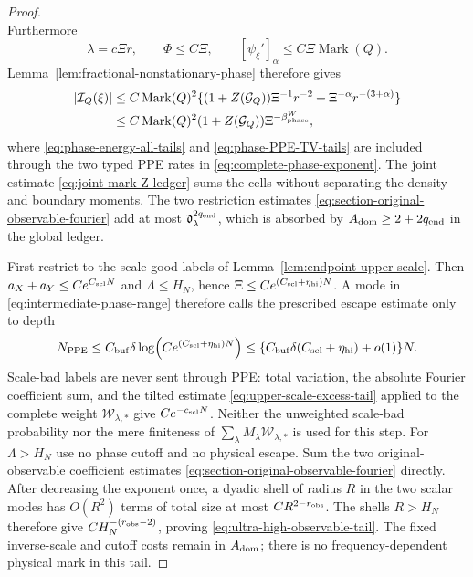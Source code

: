 \documentclass[11pt]{article}
\begin{document}
\begin{proof}
\[\]
Furthermore
\[
 \lambda=c\Xi r,\qquad
 \Phi\le C\Xi,\qquad
 [\psi_\xi']_\alpha\le C\Xi\operatorname{Mark}(Q).
\]
Lemma~\ref{lem:fractional-nonstationary-phase} therefore gives
\begin{align*}
 |\mathcal I_Q(\xi)|
 &\le C\operatorname{Mark}(Q)^2
 \{(1+Z(\mathcal G_Q))\Xi^{-1}r^{-2}
        +\Xi^{-\alpha}r^{-(3+\alpha)}\}\\
 &\le C\operatorname{Mark}(Q)^2(1+Z(\mathcal G_Q))
       \Xi^{-\beta_{\rm phase}^{W}},
\end{align*}
where \eqref{eq:phase-energy-all-tails} and
\eqref{eq:phase-PPE-TV-tails} are included through the two typed PPE rates
in \eqref{eq:complete-phase-exponent}.
The joint estimate \eqref{eq:joint-mark-Z-ledger} sums the cells without
separating the density and boundary moments.  The two restriction estimates
\eqref{eq:section-original-observable-fourier} add at most
$\mathfrak d_\lambda^{2q_{\rm end}}$, which is absorbed by
$A_{\rm dom}\ge2+2q_{\rm end}$ in the global ledger.

First restrict to the scale-good labels of
Lemma~\ref{lem:endpoint-upper-scale}.  Then
$a_X+a_Y\le Ce^{C_{\rm scl}N}$ and $\Lambda\le H_N$, hence
$\Xi\le Ce^{(C_{\rm scl}+\eta_{\rm hi})N}$.  A mode in
\eqref{eq:intermediate-phase-range} therefore calls the prescribed escape
estimate only to depth
\begin{equation}
\label{eq:intermediate-max-resolving-depth}
 N_{\rm PPE}\le C_{\rm buf}\delta
       \log\!\left(Ce^{(C_{\rm scl}+\eta_{\rm hi})N}\right)
 \le \{C_{\rm buf}\delta(C_{\rm scl}+\eta_{\rm hi})+o(1)\}N.
\end{equation}
Scale-bad labels are never sent through PPE: total variation, the absolute
Fourier coefficient sum, and the tilted estimate
\eqref{eq:upper-scale-excess-tail} applied to the complete weight
$\mathscr W_{\lambda,*}$ give $Ce^{-c_{\rm scl}N}$.  Neither the unweighted
scale-bad probability nor the mere finiteness of
$\sum_\lambda M_\lambda\mathscr W_{\lambda,*}$ is used for this step.
For $\Lambda>H_N$ use no phase cutoff and no physical escape.  Sum the two
original-observable coefficient estimates
\eqref{eq:section-original-observable-fourier} directly.  After decreasing
the exponent once, a dyadic shell of radius $R$ in the two scalar modes has
$O(R^2)$ terms of total size at most $CR^{2-r_{\rm obs}}$.  The shells
$R>H_N$ therefore give $CH_N^{-(r_{\rm obs}-2)}$, proving
\eqref{eq:ultra-high-observable-tail}.  The fixed inverse-scale and cutoff
costs remain in $A_{\rm dom}$; there is no frequency-dependent physical mark
in this tail.


\end{proof}
\end{document}
